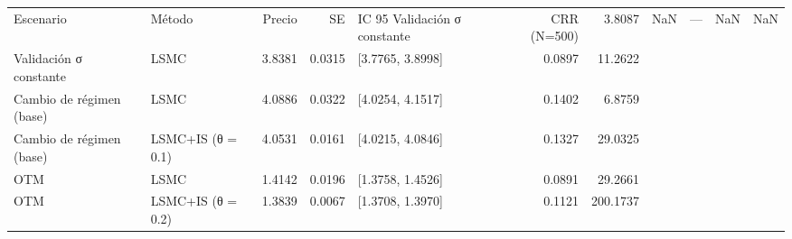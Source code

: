 \begin{tabular}{llrrlrr}
\toprule
Escenario & Método & Precio & SE & IC 95 %
\midrule
Validación σ constante & CRR (N=500) & 3.8087 & NaN & — & NaN & NaN \\
Validación σ constante & LSMC & 3.8381 & 0.0315 & [3.7765, 3.8998] & 0.0897 & 11.2622 \\
Cambio de régimen (base) & LSMC & 4.0886 & 0.0322 & [4.0254, 4.1517] & 0.1402 & 6.8759 \\
Cambio de régimen (base) & LSMC+IS (θ = 0.1) & 4.0531 & 0.0161 & [4.0215, 4.0846] & 0.1327 & 29.0325 \\
OTM & LSMC & 1.4142 & 0.0196 & [1.3758, 1.4526] & 0.0891 & 29.2661 \\
OTM & LSMC+IS (θ = 0.2) & 1.3839 & 0.0067 & [1.3708, 1.3970] & 0.1121 & 200.1737 \\
\bottomrule
\end{tabular}
